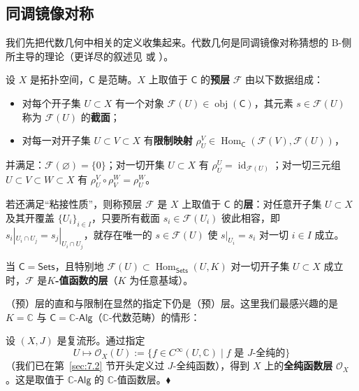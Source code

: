 \subsection{同调镜像对称}\label{sec:7.3}

我们先把代数几何中相关的定义收集起来。代数几何是同调镜像对称猜想的 B-侧所主导的理论（更详尽的叙述见 \cite{Har77} 或 \cite{Gat20}）。

\begin{Def}\label{def:7.11}
设 $X$ 是拓扑空间，$\mathsf C$ 是范畴。$X$ 上取值于 $\mathsf C$ 的\textbf{预层} $\mathcal F$ 由以下数据组成：
\begin{itemize}
  \item 对每个开子集 $U\subset X$ 有一个对象 $\mathcal F(U)\in\operatorname{obj}(\mathsf C)$，其元素 $s\in\mathcal F(U)$ 称为 $\mathcal F(U)$ 的\textbf{截面}；
  \item 对每一对开子集 $U\subset V\subset X$ 有\textbf{限制映射} $\rho_U^V\in\operatorname{Hom}_{\mathsf C}(\mathcal F(V),\mathcal F(U))$，
\end{itemize}
并满足：$\mathcal F(\varnothing)=\{0\}$；对一切开集 $U\subset X$ 有 $\rho_U^U=\operatorname{id}_{\mathcal F(U)}$；对一切三元组 $U\subset V\subset W\subset X$ 有 $\rho_U^V\circ\rho_V^W=\rho_U^W$。

若还满足“粘接性质”，则称预层 $\mathcal F$ 是 $X$ 上取值于 $\mathsf C$ 的\textbf{层}：对任意开子集 $U\subset X$ 及其开覆盖 $\{U_i\}_{i\in I}$，只要所有截面 $s_i\in\mathcal F(U_i)$ 彼此相容，即 $s_i|_{U_i\cap U_j}=s_j|_{U_i\cap U_j}$，就存在唯一的 $s\in\mathcal F(U)$ 使 $s|_{U_i}=s_i$ 对一切 $i\in I$ 成立。
\end{Def}

当 $\mathsf C=\mathsf{Sets}$，且特别地 $\mathcal F(U)\subset\operatorname{Hom}_{\mathsf{Sets}}(U,K)$ 对一切开子集 $U\subset X$ 成立时，$\mathcal F$ 是\textbf{$K$-值函数的层}（$K$ 为任意基域）。

（预）层的直和与限制在显然的指定下仍是（预）层。这里我们最感兴趣的是 $K=\mathbb C$ 与 $\mathsf C=\mathbb C\text{-}\mathsf{Alg}$（$\mathbb C$-代数范畴）的情形：

\begin{Ex}\label{ex:7.12}
设 $(X,J)$ 是复流形。通过指定
\[
U\mapsto\mathcal O_X(U):=\{f\in C^\infty(U,\mathbb C)\mid f\text{ 是 }J\text{-全纯的}\}
\]
（我们已在第~\ref{sec:7.2} 节开头定义过 $J$-全纯函数），得到 $X$ 上的\textbf{全纯函数层} $\mathcal O_X$。这是取值于 $\mathbb C\text{-}\mathsf{Alg}$ 的 $\mathbb C$-值函数层。\hfill$\blacklozenge$
\end{Ex}

